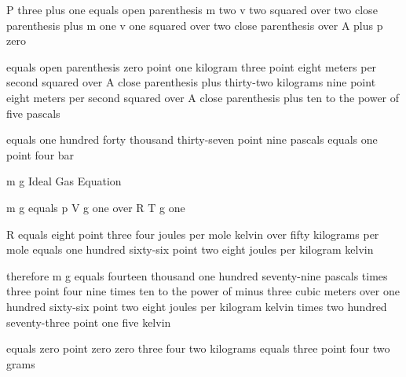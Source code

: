 P three plus one equals open parenthesis m two v two squared over two close parenthesis plus m one v one squared over two close parenthesis over A plus p zero

equals open parenthesis zero point one kilogram three point eight meters per second squared over A close parenthesis plus thirty-two kilograms nine point eight meters per second squared over A close parenthesis plus ten to the power of five pascals

equals one hundred forty thousand thirty-seven point nine pascals equals one point four bar

m g Ideal Gas Equation

m g equals p V g one over R T g one

R equals eight point three four joules per mole kelvin over fifty kilograms per mole equals one hundred sixty-six point two eight joules per kilogram kelvin

therefore m g equals fourteen thousand one hundred seventy-nine pascals times three point four nine times ten to the power of minus three cubic meters over one hundred sixty-six point two eight joules per kilogram kelvin times two hundred seventy-three point one five kelvin

equals zero point zero zero three four two kilograms equals three point four two grams